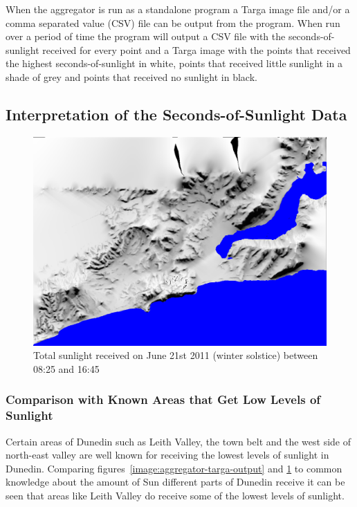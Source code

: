 \documentclass[12pt]{report}
\begin{document}
When the aggregator is run as a standalone program a Targa image file and/or a comma separated value (CSV) file can be output from the program. When run over a period of time the program will output a CSV file with the seconds-of-sunlight received for every point and a Targa image with the points that received the highest seconds-of-sunlight in white, points that received little sunlight in a shade of grey and points that received no sunlight in black.

\subsection{Interpretation of the Seconds-of-Sunlight Data}
\begin{figure}[h]
\centering
\includegraphics[scale=0.25]{wintersolstice.png}
\caption{Total sunlight received on June 21st 2011 (winter solstice) between 08:25 and 16:45}
\label{image:wintersolstice}
\end{figure}

\subsubsection{Comparison with Known Areas that Get Low Levels of Sunlight}
Certain areas of Dunedin such as Leith Valley, the town belt and the west side of north-east valley are well known for receiving the lowest levels of sunlight in Dunedin. Comparing figures~\ref{image:aggregator-targa-output} and \ref{image:wintersolstice} to common knowledge about the amount of Sun different parts of Dunedin receive it can be seen that areas like Leith Valley do receive some of the lowest levels of sunlight.
\end{document}

